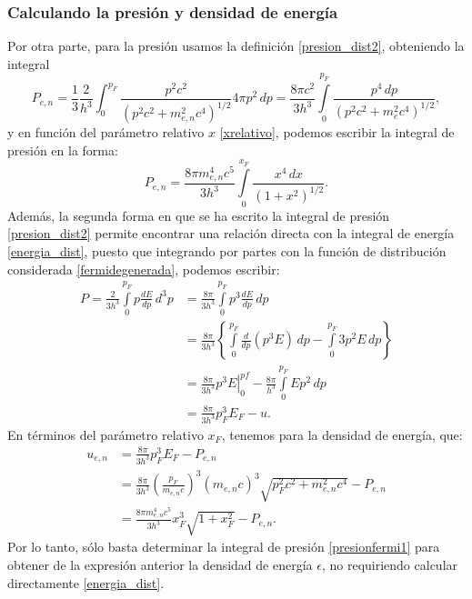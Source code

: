 \subsubsection{Calculando la presión y densidad de energía}
Por otra parte, para la presión usamos la definición \eqref{presion_dist2}, obteniendo la integral
\begin{equation}
 P_{e,n}=\frac{1}{3}\frac{2}{h^3}\int_0^{p_F}\frac{p^2c^2}{(p^2 c^2+m_{e,n}^2 c^4)^{1/2}}4\pi p^2\,dp=\frac{8\pi c^2}{3h^3}\int\limits_0^{p_F}\frac{p^4\,dp}{(p^2 c^2+m_e^2c^4)^{1/2}},
\end{equation}
y en función del parámetro relativo $x$ \eqref{xrelativo}, podemos escribir la integral de presión en la forma:
\begin{equation}\label{presionfermi1}
P_{e,n}=\frac{8\pi m_{e,n}^4c^5}{3h^3}\int\limits_0^{x_F}\frac{x^4\,dx}{(1+x^2)^{1/2}}.
\end{equation}
Además, la segunda forma en que se ha escrito la integral de presión \eqref{presion_dist2}  permite encontrar una relación directa con la integral de energía \eqref{energia_dist}, puesto que integrando por partes con la función de distribución considerada \eqref{fermidegenerada}, podemos escribir:
\begin{align}
 P=\frac{2}{3h^3}\int\limits_0^{p_F} p\frac{dE}{dp}\,d^3p&=\frac{8\pi}{3h^3}\int\limits_0^{p_F} p^3\frac{dE}{dp}\,dp\\
&=\frac{8\pi}{3h^3}\left\{\int\limits_0^{p_F} \frac{d}{dp}\left(p^3 E\right)\,dp-\int\limits_0^{p_F} 3p^2E\,dp\right\}\\
&=\left.\frac{8\pi}{3h^3}p^3E\right|_0^{pf}-\frac{8\pi}{h^3}\int\limits_0^{p_F}Ep^2\,dp\\
&=\frac{8\pi}{3h^3}p_F^3E_F-u\label{integral-presion-energia-fermi}.
\end{align}
En términos del parámetro relativo $x_F$, tenemos para la densidad de energía, que:
\begin{align}
u_{e,n}&=\frac{8\pi}{3h^3}p_F^3E_F-P_{e,n}\\
&=\frac{8\pi}{3h^3}\left(\frac{p_F}{m_{e,n}c}\right)^3\left(m_{e,n}c\right)^3\sqrt{p_F^2c^2+m_{e,n}^2c^4}-P_{e,n}\\
&=\frac{8\pi m_{e,n}^4c^5}{3h^3}x_F^3\sqrt{1+x_F^2}-P_{e,n}.\label{fermi-relacion-presion-energia}
\end{align}
Por lo tanto, sólo basta determinar la integral de presión \eqref{presionfermi1} para obtener de la expresión anterior la densidad de energía $\epsilon$, no requiriendo calcular directamente \eqref{energia_dist}.
